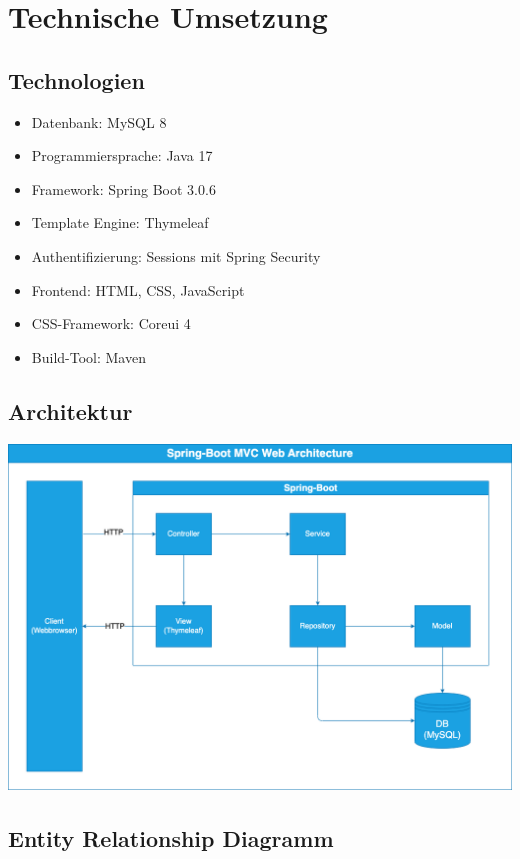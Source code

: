 \documentclass[12pt, letterpaper]{article}
\begin{document}
    \section{Technische Umsetzung}

    \subsection{Technologien}

    \begin{itemize}
        \item Datenbank: MySQL 8
        \item Programmiersprache: Java 17
        \item Framework: Spring Boot 3.0.6
        \item Template Engine: Thymeleaf
        \item Authentifizierung: Sessions mit Spring Security
        \item Frontend: HTML, CSS, JavaScript
        \item CSS-Framework: Coreui 4
        \item Build-Tool: Maven
    \end{itemize}

    \subsection{Architektur}

    \includegraphics[scale=0.35]{Architektur.png}

    \subsection{Entity Relationship Diagramm}
\end{document}
